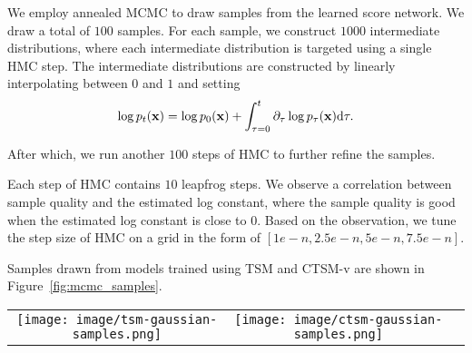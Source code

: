 We employ annealed MCMC to draw samples from the learned score network. We draw a total of $100$ samples. For each sample, we construct $1000$ intermediate distributions, where each intermediate distribution is targeted using a single HMC step. The intermediate distributions are constructed by linearly interpolating between $0$ and $1$ and setting
\begin{equation}
\log p_{t}(\operatorname{\mathbf{x}}) = \log p_{0}(\operatorname{\mathbf{x}}) + \int_{\tau=0}^{t}\partial_{\tau}\log p_{\tau}(\operatorname{\mathbf{x}})\dd \tau.
\end{equation}

After which, we run another $100$ steps of HMC to further refine the samples.

Each step of HMC contains $10$ leapfrog steps. We observe a correlation between sample quality and the estimated log constant, where the sample quality is good when the estimated log constant is close to $0$. Based on the observation, we tune the step size of HMC on a grid in the form of $[1e-n,2.5e-n,5e-n,7.5e-n]$.

Samples drawn from models trained using TSM and CTSM-v are shown in Figure~\ref{fig:mcmc_samples}.

\begin{figure*}
\centering
\begin{tabular}{ccc}
    \texttt{[image: image/tsm-gaussian-samples.png]} & \texttt{[image: image/ctsm-gaussian-samples.png]}
\end{tabular}
\caption{Left: TSM, Gaussian flows, middle: CTSM, Gaussian flows}
\label{fig:mcmc_samples}
\end{figure*}
